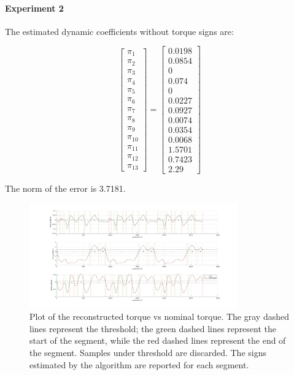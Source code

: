 \documentclass{article}
\begin{document}
\pagebreak

\paragraph{Experiment 2} The estimated dynamic coefficients without torque signs are:

\[\begin{bmatrix}
\pi_1 \\ \pi_2 \\ \pi_3 \\ \pi_4 \\ \pi_5 \\ \pi_6 \\ \pi_7 \\ \pi_8 \\  \pi_9 \\ \pi_{10} \\ \pi_{11} \\ \pi_{12} \\ \pi_{13}
\end{bmatrix}=\begin{bmatrix}
0.0198 \\ 0.0854 \\ 0 \\ 0.074 \\ 0 \\ 0.0227 \\ 0.0927 \\ 0.0074 \\ 0.0354 \\ 0.0068 \\ 1.5701 \\ 0.7423 \\ 2.29
\end{bmatrix}\]

The norm of the error is 3.7181.

\begin{figure}[!htbp]
\centering
\includegraphics[width=0.8\textwidth]{images/3-dof/results_experiment2.png}
\caption{Plot of the reconstructed torque vs nominal torque. The gray dashed lines represent the threshold; the green dashed lines represent the start of the segment, while the red dashed lines represent the end of the segment. Samples under threshold are discarded. The signs estimated by the algorithm are reported for each segment.}
\end{figure}
\FloatBarrier
\end{document}
